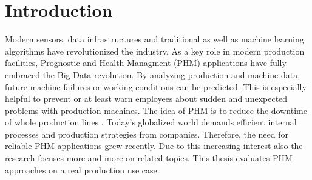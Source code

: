 
\chapter{Introduction}
Modern sensors, data infrastructures and traditional as well as machine learning algorithms have revolutionized the industry. As a key role in modern production facilities, Prognostic and Health Managment (PHM) applications have fully embraced the Big Data revolution. By analyzing production and machine data, future machine failures or working conditions can be predicted. This is especially helpful to prevent or at least warn employees about sudden and unexpected problems with production machines. The idea of PHM is to reduce the downtime of whole production lines \cite{ZHAO2019213}. Today's globalized world demands efficient internal processes and production strategies from companies. Therefore, the need for reliable PHM applications grew recently. Due to this increasing interest also the research focuses more and more on related topics. This thesis evaluates PHM approaches on a real production use case.


